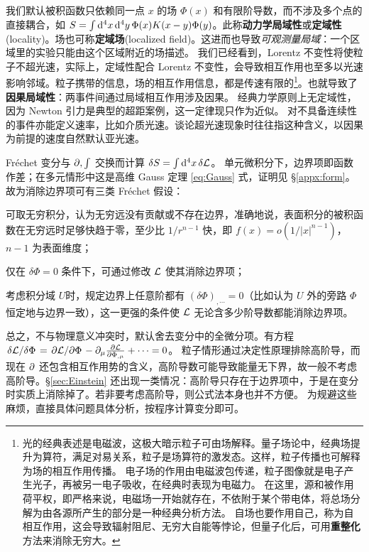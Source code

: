我们默认被积函数只依赖同一点 $x$ 的场 $\Phi(x)$ 和有限阶导数，而不涉及多个点的直接耦合，如 $S=\int\dd[4]{x}\dd[4]{y}\Phi(x)K(x-y)\Phi(y)$。此称\textbf{动力学局域性}或\textbf{定域性}(locality)。场也可称\textbf{定域场}(localized field)。这进而也导致\emph{可观测量局域}：一个区域里的实验只能由这个区域附近的场描述。
我们已经看到，Lorentz 不变性将使粒子不超光速，实际上，定域性配合 Lorentz 不变性，会导致相互作用也至多以光速影响邻域。粒子携带的信息，场的相互作用信息，都是传速有限的\footnote{光的经典表述是电磁波，这极大暗示粒子可由场解释。量子场论中，经典场提升为算符，满足对易关系，粒子是场算符的激发态。这样，粒子传播也可解释为场的相互作用传播。
电子场的作用由电磁波包传递，粒子图像就是电子产生光子，再被另一电子吸收，在经典时表现为电磁力。
在这里，源和被作用荷平权，即严格来说，电磁场一开始就存在，不依附于某个带电体，将总场分解为由各源所产生的部分是一种经典分析方法。
自场也要作用自己，称为自相互作用，这会导致辐射阻尼、无穷大自能等悖论，但量子化后，可用\textbf{重整化}方法来消除无穷大。}。也就导致了\textbf{因果局域性}：两事件间通过局域相互作用涉及因果。
经典力学原则上无定域性，因为 Newton 引力是典型的超距案例，这一定律现只作为近似。
对不具备连续性的事件亦能定义速率，比如介质光速。谈论超光速现象时往往指这种含义，以因果为前提的速度自然默认亚光速。

Fréchet 变分与 $\partial,\int$ 交换而计算 $\var S=\int \dd[4]{x}\var\mathcal{L}$。
单元微积分下，边界项即函数作差；在多元情形中这是高维 Gauss 定理 \eqref{eq:Gauss} 式，证明见 \S\ref{appx:form}。故为消除边界项可有三类 Fréchet 假设：
\begin{compactenum}
    \item 可取无穷积分，认为无穷远没有贡献或不存在边界，准确地说，表面积分的被积函数在无穷远时足够快趋于零，至少比 $1/r^{n-1}$ 快，即 $f(x)=o(1/|x|^{n-1})$，$n-1$ 为表面维度；
    \item 仅在 $\delta \Phi=0$ 条件下，可通过修改 $\mathcal{L}$ 使其消除边界项；
    \item 考虑积分域 $U$时，规定边界上任意阶都有 $(\delta \Phi)_{,\cdots}=0$（比如认为 $U$ 外的旁路 $\Phi$ 恒定地与边界一致），这一更强的条件使 $\mathcal{L}$ 无论含多少阶导数都能消除边界项。
\end{compactenum}
总之，不与物理意义冲突时，默认舍去变分中的全微分项。有方程 $\fdv*{\Lag}{\Phi}=\pdv*{\Lag}{\Phi}-\p_\mu\pdv{\Lag}{\Phi_{,\mu}}+\cdots=0$。
粒子情形通过决定性原理排除高阶导，而现在 $\partial$ 还包含相互作用势的含义，高阶导数可能导致能量无下界，故一般不考虑高阶导。\S\ref{sec:Einstein} 还出现一类情况：高阶导只存在于边界项中，于是在变分时实质上消除掉了。若非要考虑高阶导，则公式法本身也并不方便。
为规避这些麻烦，直接具体问题具体分析，按程序计算变分即可。


